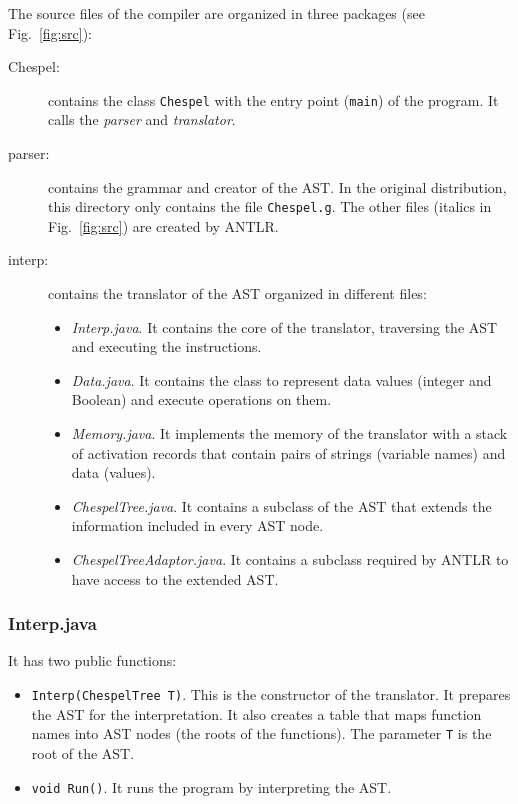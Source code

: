 The source files of the compiler are organized in three packages
(see Fig.~\ref{fig:src}):
\begin{description}
 \item [Chespel:] contains the class \texttt{Chespel} with the entry point
(\texttt{main}) of the program. It calls the \emph{parser} and
\emph{translator}.
\item [parser:] contains the grammar and creator of the AST.
In the original distribution, this directory only contains the file
\texttt{Chespel.g}. The other files (italics in Fig.~\ref{fig:src}) are
created by ANTLR.
\item [interp:] contains the translator of the AST organized in different
files:
\begin{itemize}
 \item \emph{Interp.java}. It contains the core of the translator,
traversing the AST and executing the instructions.
\item \emph{Data.java}. It contains the class to represent data values
(integer and Boolean) and execute operations on them.
\item \emph{Memory.java}. It implements the memory of the translator with a
stack of activation records that contain pairs of strings (variable names)
and data (values).
\item \emph{ChespelTree.java}. It contains a subclass of the AST that extends the
information included in every AST node.
\item \emph{ChespelTreeAdaptor.java}. It contains a subclass required by ANTLR to
have access to the extended AST.
\end{itemize}
\end{description}

\subsubsection{Interp.java}

It has two public functions:
\begin{itemize}
 \item \texttt{Interp(ChespelTree T)}. This is the constructor of the
translator. It prepares the AST for the interpretation. It also creates a
table that maps function names into AST nodes (the roots of the functions).
The parameter \texttt{T} is the root of the AST.

\item \texttt{void Run()}. It runs the program by interpreting the AST.
\end{itemize}


